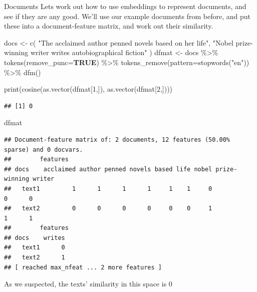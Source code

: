 \documentclass[
  10pt,
  ignorenonframetext,
  aspectratio=169]{beamer}
\newenvironment{Shaded}{\begin{snugshade}}{\end{snugshade}}
\newcommand{\AttributeTok}[1]{\textcolor[rgb]{0.80,0.80,0.80}{#1}}
\newcommand{\ConstantTok}[1]{\textcolor[rgb]{0.86,0.64,0.64}{\textbf{#1}}}
\newcommand{\DecValTok}[1]{\textcolor[rgb]{0.86,0.86,0.80}{#1}}
\newcommand{\FunctionTok}[1]{\textcolor[rgb]{0.94,0.94,0.56}{#1}}
\newcommand{\NormalTok}[1]{\textcolor[rgb]{0.80,0.80,0.80}{#1}}
\newcommand{\OtherTok}[1]{\textcolor[rgb]{0.94,0.94,0.56}{#1}}
\newcommand{\SpecialCharTok}[1]{\textcolor[rgb]{0.86,0.64,0.64}{#1}}
\newcommand{\StringTok}[1]{\textcolor[rgb]{0.80,0.58,0.58}{#1}}
\begin{document}
\begin{frame}[fragile]{Documents}
\protect\hypertarget{documents}{}
Lets work out how to use embeddings to represent documents, and see if
they are any good. We'll use our example documents from before, and put
these into a document-feature matrix, and work out their similarity.

\medskip

\scriptsize

\begin{Shaded}
\begin{Highlighting}[]
\NormalTok{docs }\OtherTok{\textless{}{-}} \FunctionTok{c}\NormalTok{(}
  \StringTok{"The acclaimed author penned novels based on her life"}\NormalTok{,}
  \StringTok{"Nobel prize{-}winning writer writes autobiographical fiction"}
\NormalTok{)}
\NormalTok{dfmat }\OtherTok{\textless{}{-}}\NormalTok{ docs }\SpecialCharTok{\%\textgreater{}\%} \FunctionTok{tokens}\NormalTok{(}\AttributeTok{remove\_punc=}\ConstantTok{TRUE}\NormalTok{) }\SpecialCharTok{\%\textgreater{}\%}
  \FunctionTok{tokens\_remove}\NormalTok{(}\AttributeTok{pattern=}\FunctionTok{stopwords}\NormalTok{(}\StringTok{"en"}\NormalTok{)) }\SpecialCharTok{\%\textgreater{}\%}
  \FunctionTok{dfm}\NormalTok{() }

\FunctionTok{print}\NormalTok{(}\FunctionTok{cosine}\NormalTok{(}\FunctionTok{as.vector}\NormalTok{(dfmat[}\DecValTok{1}\NormalTok{,]), }\FunctionTok{as.vector}\NormalTok{(dfmat[}\DecValTok{2}\NormalTok{,])))}
\end{Highlighting}
\end{Shaded}

\begin{verbatim}
## [1] 0
\end{verbatim}

\begin{Shaded}
\begin{Highlighting}[]
\NormalTok{dfmat}
\end{Highlighting}
\end{Shaded}

\begin{verbatim}
## Document-feature matrix of: 2 documents, 12 features (50.00% sparse) and 0 docvars.
##        features
## docs    acclaimed author penned novels based life nobel prize-winning writer
##   text1         1      1      1      1     1    1     0             0      0
##   text2         0      0      0      0     0    0     1             1      1
##        features
## docs    writes
##   text1      0
##   text2      1
## [ reached max_nfeat ... 2 more features ]
\end{verbatim}

\normalsize
\medskip

As we suspected, the texts' similarity in this space is 0
\end{frame}
\end{document}
